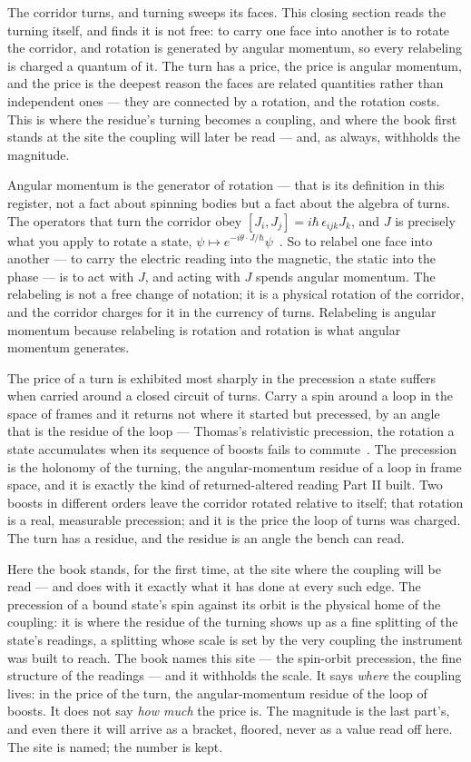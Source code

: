 The corridor turns, and turning sweeps its faces. This closing section reads the turning itself, and finds it is not free:
to carry one face into another is to rotate the corridor, and rotation is generated by angular momentum, so every relabeling
is charged a quantum of it. The turn has a price, the price is angular momentum, and the price is the deepest reason the
faces are related quantities rather than independent ones --- they are connected by a rotation, and the rotation costs. This
is where the residue's turning becomes a coupling, and where the book first stands at the site the coupling will later be
read --- and, as always, withholds the magnitude.

Angular momentum is the generator of rotation --- that is its definition in this register, not a fact about spinning bodies
but a fact about the algebra of turns. The operators that turn the corridor obey $[J_i, J_j] = i\hbar\,\epsilon_{ijk}J_k$,
and $J$ is precisely what you apply to rotate a state, $\psi \mapsto e^{-i\theta \cdot J/\hbar}\psi$~\cite{pauli1927}. So to
relabel one face into another --- to carry the electric reading into the magnetic, the static into the phase --- is to act
with $J$, and acting with $J$ spends angular momentum. The relabeling is not a free change of notation; it is a physical
rotation of the corridor, and the corridor charges for it in the currency of turns. Relabeling is angular momentum because
relabeling is rotation and rotation is what angular momentum generates.

The price of a turn is exhibited most sharply in the precession a state suffers when carried around a closed circuit of
turns. Carry a spin around a loop in the space of frames and it returns not where it started but precessed, by an angle that
is the residue of the loop --- Thomas's relativistic precession, the rotation a state accumulates when its sequence of
boosts fails to commute~\cite{goldstein2002}. The precession is the holonomy of the turning, the angular-momentum residue of
a loop in frame space, and it is exactly the kind of returned-altered reading Part II built. Two boosts in different orders
leave the corridor rotated relative to itself; that rotation is a real, measurable precession; and it is the price the loop
of turns was charged. The turn has a residue, and the residue is an angle the bench can read.

Here the book stands, for the first time, at the site where the coupling will be read --- and does with it exactly what it
has done at every such edge. The precession of a bound state's spin against its orbit is the physical home of the coupling:
it is where the residue of the turning shows up as a fine splitting of the state's readings, a splitting whose scale is set
by the very coupling the instrument was built to reach. The book names this site --- the spin-orbit precession, the fine
structure of the readings --- and it withholds the scale. It says \emph{where} the coupling lives: in the price of the turn,
the angular-momentum residue of the loop of boosts. It does not say \emph{how much} the price is. The magnitude is the last
part's, and even there it will arrive as a bracket, floored, never as a value read off here. The site is named; the number is
kept.

